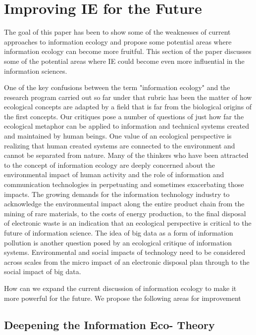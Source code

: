 \section{Improving IE for the Future}


The goal of this paper has been to show some of the weaknesses of current approaches to information ecology and propose some potential areas where information ecology can become more fruitful. This section of the paper discusses some of the potential areas where IE could become even more influential in the information sciences.

One of the key confusions between the term "information ecology" and the research program carried out so far under that rubric has been the matter of how ecological concepts are adapted by a field that is far from the biological origins of the first concepts. Our critiques pose a number of questions of just how far the ecological metaphor can be applied to information and technical systems created and maintained by human beings. One value of an ecological perspective is realizing that human created systems are connected to the environment and cannot be separated from nature. Many of the thinkers who have been attracted to the concept of information ecology are deeply concerned about the environmental impact of human activity and the role of information and communication technologies in perpetuating and sometimes exacerbating those impacts. The growing demands for the information technology industry to acknowledge the environmental impact along the entire product chain from the mining of rare materials, to the costs of energy production, to the final disposal of electronic waste is an indication that an ecological perspective is critical to the future of information science. The idea of big data as a form of information pollution is another question posed by an ecological critique of information systems. Environmental and social impacts of technology need to be considered across scales from the micro impact of an electronic disposal plan through to the social impact of big data.

How can we expand the current discussion of information ecology to make it more powerful for the future. We propose the following areas for improvement

\subsection{Deepening the Information Eco- Theory}

